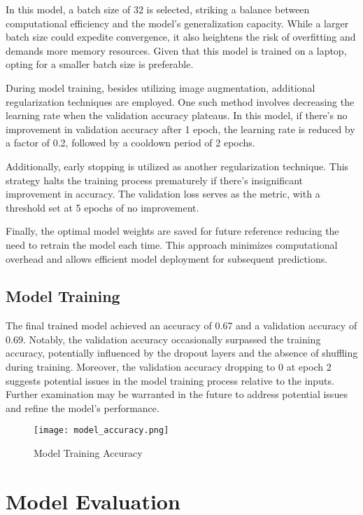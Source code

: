 \documentclass[11pt]{article}
\begin{document}
In this model, a batch size of 32 is selected, striking a balance between computational efficiency and the model's generalization capacity. While a larger batch size could expedite convergence, it also heightens the risk of overfitting and demands more memory resources. Given that this model is trained on a laptop, opting for a smaller batch size is preferable.

During model training, besides utilizing image augmentation, additional regularization techniques are employed. One such method involves decreasing the learning rate when the validation accuracy plateaus. In this model, if there's no improvement in validation accuracy after 1 epoch, the learning rate is reduced by a factor of 0.2, followed by a cooldown period of 2 epochs.

Additionally, early stopping is utilized as another regularization technique. This strategy halts the training process prematurely if there's insignificant improvement in accuracy. The validation loss serves as the metric, with a threshold set at 5 epochs of no improvement.

Finally, the optimal model weights are saved for future reference reducing the need to retrain the model each time. This approach minimizes computational overhead and allows efficient model deployment for subsequent predictions.

\subsection{Model Training}


The final trained model achieved an accuracy of 0.67 and a validation accuracy of 0.69. Notably, the validation accuracy occasionally surpassed the training accuracy, potentially influenced by the dropout layers and the absence of shuffling during training. Moreover, the validation accuracy dropping to 0 at epoch 2 suggests potential issues in the model training process relative to the inputs. Further examination may be warranted in the future to address potential issues and refine the model's performance.

\begin{figure}[h]
    \centering
    \texttt{[image: model\_accuracy.png]}
    \caption{\label{fig:model_acc}Model Training Accuracy}
\end{figure}

\section{Model Evaluation}
\end{document}
